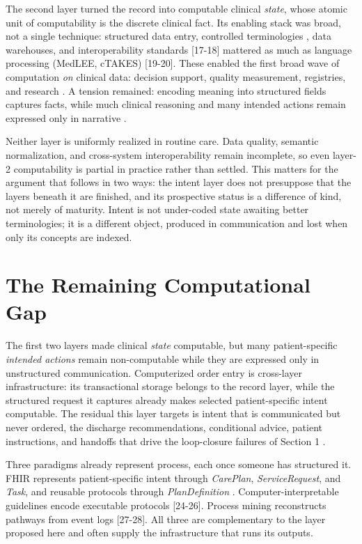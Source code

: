The second layer turned the record into computable clinical \emph{state}, whose atomic unit of computability is the discrete clinical fact. Its enabling stack was broad, not a single technique: structured data entry, controlled terminologies \cite{ref16}, data warehouses, and interoperability standards {[}17-18{]} mattered as much as language processing (MedLEE, cTAKES) {[}19-20{]}. These enabled the first broad wave of computation \emph{on} clinical data: decision support, quality measurement, registries, and research \cite{ref21}. A tension remained: encoding meaning into structured fields captures facts, while much clinical reasoning and many intended actions remain expressed only in narrative \cite{ref22}.

Neither layer is uniformly realized in routine care. Data quality, semantic normalization, and cross-system interoperability remain incomplete, so even layer-2 computability is partial in practice rather than settled. This matters for the argument that follows in two ways: the intent layer does not presuppose that the layers beneath it are finished, and its prospective status is a difference of kind, not merely of maturity. Intent is not under-coded state awaiting better terminologies; it is a different object, produced in communication and lost when only its concepts are indexed.

\section{The Remaining Computational Gap}\label{the-remaining-computational-gap}

The first two layers made clinical \emph{state} computable, but many patient-specific \emph{intended actions} remain non-computable while they are expressed only in unstructured communication. Computerized order entry is cross-layer infrastructure: its transactional storage belongs to the record layer, while the structured request it captures already makes selected patient-specific intent computable. The residual this layer targets is intent that is communicated but never ordered, the discharge recommendations, conditional advice, patient instructions, and handoffs that drive the loop-closure failures of Section 1 \cite{ref1, ref6}.

Three paradigms already represent process, each once someone has structured it. FHIR represents patient-specific intent through \emph{CarePlan}, \emph{ServiceRequest}, and \emph{Task}, and reusable protocols through \emph{PlanDefinition} \cite{ref23}. Computer-interpretable guidelines encode executable protocols {[}24-26{]}. Process mining reconstructs pathways from event logs {[}27-28{]}. All three are complementary to the layer proposed here and often supply the infrastructure that runs its outputs.

